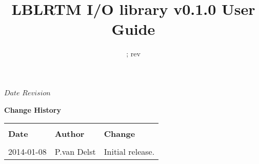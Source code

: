 



\newcommand{\File}{\texttt{File}}
\newcommand{\Layer}{\texttt{Layer}}
\newcommand{\Fhdr}{\texttt{Fhdr}}
\newcommand{\Panel}{\texttt{Panel}}
\newcommand{\Phdr}{\texttt{Phdr}}
\newcommand{\f}[1]{\texttt{#1}}
\newcommand{\tblhd}[1]{\sffamily\textbf{#1}}

\newcommand{\inarg}[1]{\f{\textcolor{green}{#1}}}
\newcommand{\outarg}[1]{\f{\textcolor{red}{#1}}}
\newcommand{\optarg}[1]{\f{\textit{#1}}}

\SVN $Date$
\SVN $Revision$

\title{LBLRTM I/O library v0.1.0 User Guide}
\date{\SVNDate ; rev\SVNRevision}



\maketitle


\thispagestyle{empty}
\vspace*{10cm}
\begin{center}
  {\sffamily\Large\bfseries Change History}
  \begin{table}[htp]
    \centering
    \begin{tabular}{ p{2cm} p{3cm} p{8cm} }
      \hline\\[-0.1cm]
      \tblhd{Date} & \tblhd{Author} & \tblhd{Change}\\
      \hline\hline\\[-0.2cm]
      2014-01-08 & P.van Delst & Initial release.\\
      \hline
    \end{tabular}
  \end{table}
\end{center}
\clearpage

\setcounter{page}{1}
  \tableofcontents\newpage
  \listoffigures\newpage
  \listoftables\newpage
  
\setcounter{page}{1}









\begin{appendix}
  
\end{appendix}



